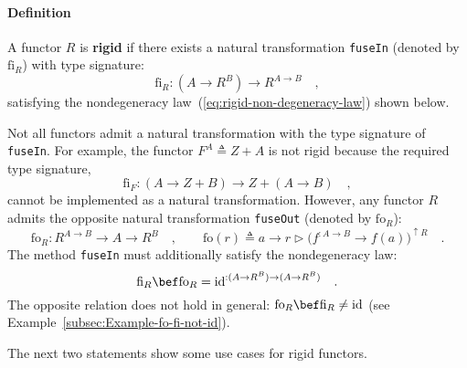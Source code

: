 \paragraph{Definition }

A functor $R$ is \textbf{rigid} if there exists
a natural transformation \lstinline!fuseIn! (denoted by $\text{fi}_{R}$)
with type signature:
\[
\text{fi}_{R}:(A\rightarrow R^{B})\rightarrow R^{A\rightarrow B}\quad,
\]
satisfying the nondegeneracy law~(\ref{eq:rigid-non-degeneracy-law})
shown below.

Not all functors admit a natural transformation with the type signature
of \lstinline!fuseIn!. For example, the functor $F^{A}\triangleq Z+A$
is not rigid because the required type signature,
\[
\text{fi}_{F}:\left(A\rightarrow Z+B\right)\rightarrow Z+\left(A\rightarrow B\right)\quad,
\]
cannot be implemented as a natural transformation. However, any functor
$R$ admits the opposite natural transformation \lstinline!fuseOut!
(denoted by $\text{fo}_{R}$):
\begin{equation}
\text{fo}_{R}:R^{A\rightarrow B}\rightarrow A\rightarrow R^{B}\quad,\quad\quad\text{fo}\left(r\right)\triangleq a\rightarrow r\triangleright\big(f^{:A\rightarrow B}\rightarrow f\left(a\right)\big)^{\uparrow R}\quad.\label{eq:fuseOut-def}
\end{equation}
The method \lstinline!fuseIn! must additionally satisfy the nondegeneracy
law:
\begin{equation}
\text{fi}_{R}\bef\text{fo}_{R}=\text{id}^{:(A\rightarrow R^{B})\rightarrow(A\rightarrow R^{B})}\quad.\label{eq:rigid-non-degeneracy-law}
\end{equation}
The opposite relation does not hold in general: $\text{fo}_{R}\bef\text{fi}_{R}\neq\text{id}$
(see Example~\ref{subsec:Example-fo-fi-not-id}).

The next two statements show some use cases for rigid functors. 

